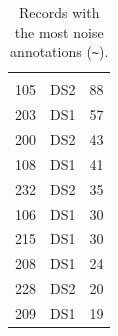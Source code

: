 \begin{table}[H]
  \centering
  \caption{Records with the most noise annotations (\texttt{\textasciitilde}).}
  \label{tab:noise-marks}
  \begin{tabularx}{\linewidth}{YRR}
     &  &  \\
    105 & DS2 & 88 \\
    203 & DS1 & 57 \\
    200 & DS2 & 43 \\
    108 & DS1 & 41 \\
    232 & DS2 & 35 \\
    106 & DS1 & 30 \\
    215 & DS1 & 30 \\
    208 & DS1 & 24 \\
    228 & DS2 & 20 \\
    209 & DS1 & 19 \\
    \bottomrule
  \end{tabularx}
\end{table}
